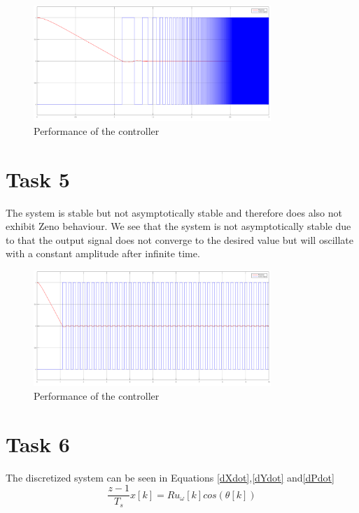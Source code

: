 \documentclass[a4paper,12pt,oneside,onecolumn]{article} %
\begin{document}
\begin{figure}[H]
\begin{center}	
  \includegraphics[width = 0.8\textwidth]{rot2.png}
  \caption{Performance of the controller}
  
 \end{center}
\end{figure}
\section*{Task 5}

The system is stable but not asymptotically stable and therefore does also not exhibit Zeno behaviour. We see that the system is not asymptotically stable due to that the output signal does not converge to the desired value but will oscillate with a constant amplitude after infinite time.

\begin{figure}[H]
\begin{center}	
  \includegraphics[width = 0.8\textwidth]{rot3.png}
  \caption{Performance of the controller}
  
 \end{center}
\end{figure}
\section*{Task 6}

The discretized system can be seen in Equations \eqref{dXdot},\eqref{dYdot} and\eqref{dPdot}
\begin{equation}
\frac{z-1}{T_s} x[k] = Ru_\omega[k] cos(\theta[k])\label{dXdot}
\end{equation}
\end{document}
